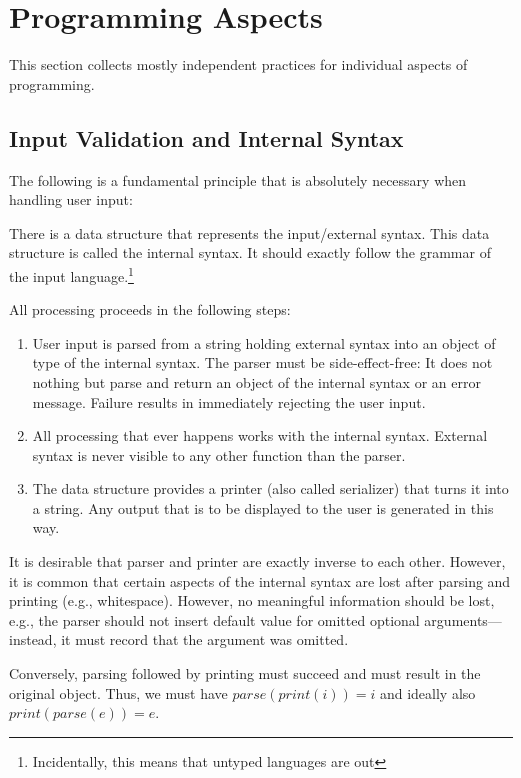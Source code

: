\section{Programming Aspects}

This section collects mostly independent practices for individual aspects of programming.

\subsection{Input Validation and Internal Syntax}

The following is a fundamental principle that is absolutely necessary when handling user input:
\begin{compactitem}
 \item There is a data structure that represents the input/external syntax.
 This data structure is called the internal syntax.
 It should exactly follow the grammar of the input language.\footnote{Incidentally, this means that untyped languages are out}
 \item All processing proceeds in the following steps:
 \begin{enumerate}
 \item User input is parsed from a string holding external syntax into an object of type of the internal syntax.
  The parser must be side-effect-free: It does not nothing but parse and return an object of the internal syntax or an error message.
  Failure results in immediately rejecting the user input.
  \item All processing that ever happens works with the internal syntax.
  External syntax is never visible to any other function than the parser.
  \item The data structure provides a printer (also called serializer) that turns it into a string.
  Any output that is to be displayed to the user is generated in this way.
 \end{enumerate}
\end{compactitem}

It is desirable that parser and printer are exactly inverse to each other.
However, it is common that certain aspects of the internal syntax are lost after parsing and printing (e.g., whitespace).
However, no meaningful information should be lost, e.g., the parser should not insert default value for omitted optional arguments---instead, it must record that the argument was omitted.

Conversely, parsing followed by printing must succeed and must result in the original object.
Thus, we must have $parse(print(i))=i$ and ideally also $print(parse(e))=e$.
 
